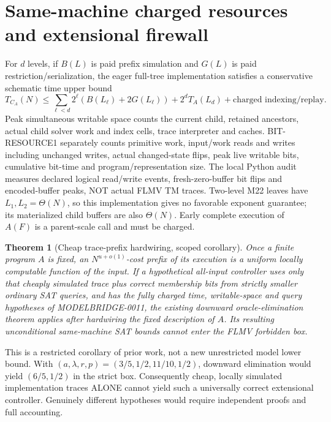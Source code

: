 \documentclass[11pt]{article}
\newtheorem{theorem}{Theorem}
\begin{document}
\section{Same-machine charged resources and extensional firewall}
For $d$ levels, if $B(L)$ is paid prefix simulation and $G(L)$ is paid restriction/serialization, the eager full-tree implementation satisfies a conservative schematic time upper bound
\[
T_{C_A}(N)\le\sum_{\ell<d}2^\ell(B(L_\ell)+2G(L_\ell))
      +2^d T_A(L_d)+\text{charged indexing/replay}.
\]
Peak simultaneous writable space counts the current child, retained ancestors, actual child solver work and index cells, trace interpreter and caches. BIT-RESOURCE1 separately counts primitive work, input/work reads and writes including unchanged writes, actual changed-state flips, peak live writable bits, cumulative bit-time and program/representation size. The local Python audit measures declared logical read/write events, fresh-zero-buffer bit flips and encoded-buffer peaks, NOT actual FLMV TM traces. Two-level M22 leaves have $L_1,L_2=\Theta(N)$, so this implementation gives no favorable exponent guarantee; its materialized child buffers are also $\Theta(N)$. Early complete execution of $A(F)$ is a parent-scale call and must be charged.

\begin{theorem}[Cheap trace-prefix hardwiring, scoped corollary]
Once a finite program $A$ is fixed, an $N^{u+o(1)}$-cost prefix of its execution is a uniform locally computable function of the input. If a hypothetical all-input controller uses only that cheaply simulated trace plus correct membership bits from strictly smaller ordinary SAT queries, and has the fully charged time, writable-space and query hypotheses of MODELBRIDGE-0011, the existing downward oracle-elimination theorem applies after hardwiring the fixed description of $A$. Its resulting unconditional same-machine SAT bounds cannot enter the FLMV forbidden box.
\end{theorem}
This is a restricted corollary of prior work, not a new unrestricted model lower bound. With $(a,\lambda,r,p)=(3/5,1/2,11/10,1/2)$, downward elimination would yield $(6/5,1/2)$ in the strict box. Consequently cheap, locally simulated implementation traces ALONE cannot yield such a universally correct extensional controller. Genuinely different hypotheses would require independent proofs and full accounting.
\end{document}
